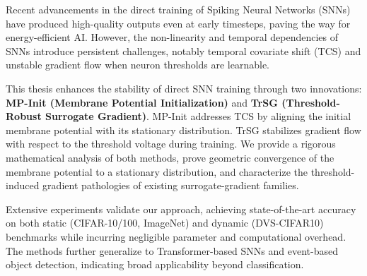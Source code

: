 
Recent advancements in the direct training of Spiking Neural Networks (SNNs) have produced high-quality outputs even at early timesteps, paving the way for energy-efficient AI. However, the non-linearity and temporal dependencies of SNNs introduce persistent challenges, notably temporal covariate shift (TCS) and unstable gradient flow when neuron thresholds are learnable.

This thesis enhances the stability of direct SNN training through two innovations: \textbf{MP-Init (Membrane Potential Initialization)} and \textbf{TrSG (Threshold-Robust Surrogate Gradient)}. MP-Init addresses TCS by aligning the initial membrane potential with its stationary distribution. TrSG stabilizes gradient flow with respect to the threshold voltage during training. We provide a rigorous mathematical analysis of both methods, prove geometric convergence of the membrane potential to a stationary distribution, and characterize the threshold-induced gradient pathologies of existing surrogate-gradient families.

Extensive experiments validate our approach, achieving state-of-the-art accuracy on both static (CIFAR-10/100, ImageNet) and dynamic (DVS-CIFAR10) benchmarks while incurring negligible parameter and computational overhead. The methods further generalize to Transformer-based SNNs and event-based object detection, indicating broad applicability beyond classification.
